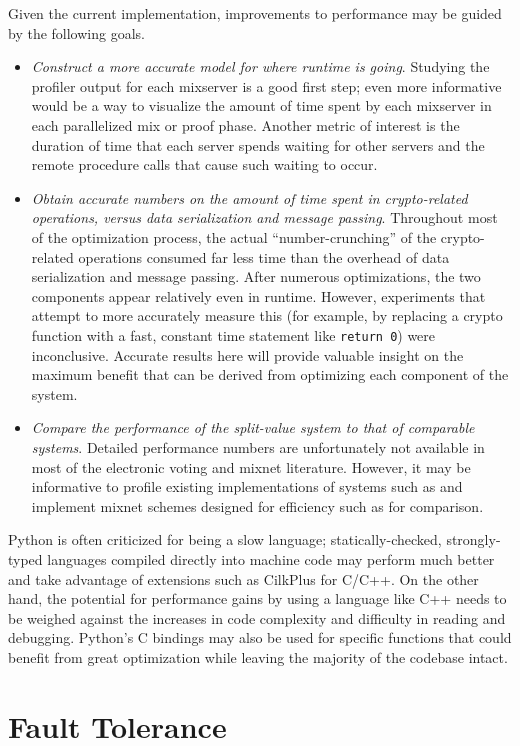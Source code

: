 Given the current implementation, improvements to performance may be guided by the following goals.
\begin{itemize}
\item \emph{Construct a more accurate model for where runtime is going}. Studying the profiler output for each mixserver is a good first step; even more informative would be a way to visualize the amount of time spent by each mixserver in each parallelized mix or proof phase. Another metric of interest is the duration of time that each server spends waiting for other servers and the remote procedure calls that cause such waiting to occur.
\item \emph{Obtain accurate numbers on the amount of time spent in crypto-related operations, versus data serialization and message passing}. Throughout most of the optimization process, the actual ``number-crunching'' of the crypto-related operations consumed far less time than the overhead of data serialization and message passing. After numerous optimizations, the two components appear relatively even in runtime. However, experiments that attempt to more accurately measure this (for example, by replacing a crypto function with a fast, constant time statement like \texttt{return 0}) were inconclusive. Accurate results here will provide valuable insight on the maximum benefit that can be derived from optimizing each component of the system.
\item \emph{Compare the performance of the split-value system to that of comparable systems}. Detailed performance numbers are unfortunately not available in most of the electronic voting and mixnet literature. However, it may be informative to profile existing implementations of systems such as \cite{votebox, adida-helios} and implement mixnet schemes designed for efficiency such as \cite{chase13} for comparison.
\end{itemize}

Python is often criticized for being a slow language; statically-checked, strongly-typed languages compiled directly into machine code may perform much better and take advantage of extensions such as CilkPlus for C/C++. On the other hand, the potential for performance gains by using a language like C++ needs to be weighed against the increases in code complexity and difficulty in reading and debugging. Python's C bindings may also be used for specific functions that could benefit from great optimization while leaving the majority of the codebase intact.

\section{Fault Tolerance}

